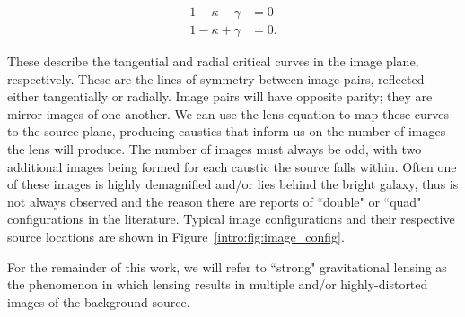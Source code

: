 \begin{align}
1-\kappa-\gamma &= 0 \\
1-\kappa+\gamma &= 0.
\end{align}

\noindent These describe the tangential and radial critical curves in the image plane, respectively. These are the lines of symmetry between image pairs, reflected either tangentially or radially. Image pairs will have opposite parity; they are mirror images of one another. We can use the lens equation to map these curves to the source plane, producing caustics that inform us on the number of images the lens will produce. The number of images must always be odd, with two additional images being formed for each caustic the source falls within. Often one of these images is highly demagnified and/or lies behind the bright galaxy, thus is not always observed and the reason there are reports of ``double" or ``quad" configurations in the literature. Typical image configurations and their respective source locations are shown in Figure~\ref{intro:fig:image_config}.

For the remainder of this work, we will refer to ``strong" gravitational lensing as the phenomenon in which lensing results in multiple and/or highly-distorted images of the background source.

